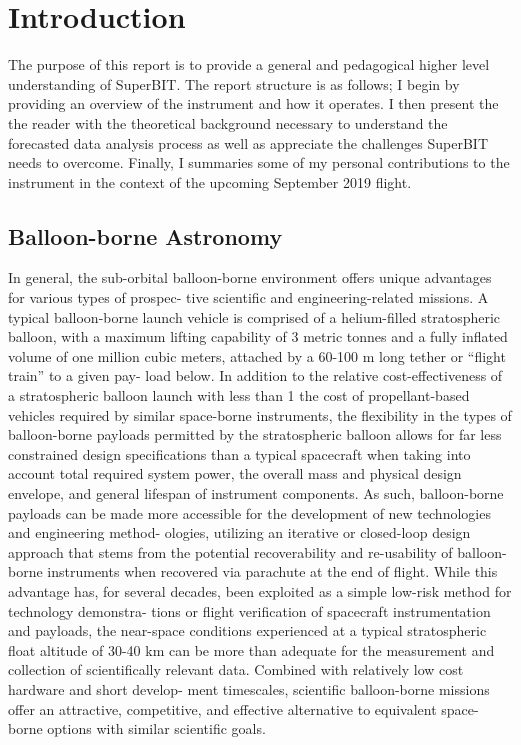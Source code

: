 \chapter{Introduction}

The purpose of this report is to provide a general and pedagogical higher level understanding of SuperBIT. The report structure is as follows; I begin by providing an overview of the instrument and how it operates. I then present the the reader with the theoretical background necessary to understand the forecasted data analysis process as well as appreciate the challenges SuperBIT needs to overcome. Finally, I summaries some of my personal contributions to the instrument in the context of the upcoming September 2019 flight. 
  

\section{Balloon-borne Astronomy}

In general, the sub-orbital balloon-borne environment offers unique advantages for various types of prospec-
tive scientific and engineering-related missions. A typical balloon-borne launch vehicle is comprised of a
helium-filled stratospheric balloon, with a maximum lifting capability of 3 metric tonnes and a fully inflated
volume of one million cubic meters, attached by a 60-100 m long tether or “flight train” to a given pay-
load below. In addition to the relative cost-effectiveness of a stratospheric balloon launch with less than
1 the cost of propellant-based vehicles required by similar space-borne instruments, the flexibility in the
types of balloon-borne payloads permitted by the stratospheric balloon allows for far less constrained design
specifications than a typical spacecraft when taking into account total required system power, the overall
mass and physical design envelope, and general lifespan of instrument components. As such, balloon-borne
payloads can be made more accessible for the development of new technologies and engineering method-
ologies, utilizing an iterative or closed-loop design approach that stems from the potential recoverability
and re-usability of balloon-borne instruments when recovered via parachute at the end of flight. While this
advantage has, for several decades, been exploited as a simple low-risk method for technology demonstra-
tions or flight verification of spacecraft instrumentation and payloads, the near-space conditions experienced
at a typical stratospheric float altitude of 30-40 km can be more than adequate for the measurement and
collection of scientifically relevant data. Combined with relatively low cost hardware and short develop-
ment timescales, scientific balloon-borne missions offer an attractive, competitive, and effective alternative
to equivalent space-borne options with similar scientific goals.

